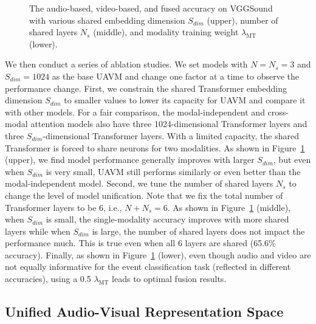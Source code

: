\documentclass[journal]{IEEEtran}
\newcommand{\squeezeup}{\vspace{-1.6mm}}
\newcommand{\rev}[1]{{\color{dblue} #1}}
\begin{document}
\begin{figure}[t]
\squeezeup\squeezeup

\squeezeup\squeezeup

\vspace{-1.0em}
\caption{The audio-based, video-based, and fused accuracy on VGGSound with various shared embedding dimension $S_{dim}$ (upper), number of shared layers $N_s$ (middle), and modality training weight $\lambda_{\text{MT}}$ (lower).}
\label{fig:exp1}
\vspace{-1.5em}
\end{figure}

We then conduct a series of ablation studies. We set models with $N=N_s=3$ and $S_{dim}=1024$ as the base UAVM and change one factor at a time to observe the performance change. First, we constrain the shared Transformer embedding dimension $S_{dim}$ to smaller values to lower its capacity for UAVM and compare it with other models. For a fair comparison, the modal-independent and cross-modal attention models also have three 1024-dimensional Transformer layers and three $S_{dim}$-dimensional Transformer layers. With a limited capacity, the shared Transformer is forced to share neurons for two modalities. As shown in Figure~\ref{fig:exp1} (upper), we find model performance generally improves with larger $S_{dim}$, but even when $S_{dim}$ is very small, UAVM still performs similarly or even better than the modal-independent model. Second, we tune the number of shared layers $N_{s}$ to change the level of model unification. Note that we fix the total number of Transformer layers to be 6, i.e., $N + N_s=6$. As shown in Figure~\ref{fig:exp1} (middle), when $S_{dim}$ is small, the single-modality accuracy improves with more shared layers while when $S_{dim}$ is large, the number of shared layers does not impact the performance much. \rev{This is true even when all 6 layers are shared (65.6\% accuracy)}. Finally, as shown in Figure~\ref{fig:exp1} (lower), even though audio and video are not equally informative for the event classification task (reflected in different accuracies), using a 0.5 $\lambda_{\text{MT}}$ leads to optimal fusion results.

\squeezeup\squeezeup
\subsection{Unified Audio-Visual Representation Space}
\label{sec:exp2}
\end{document}
